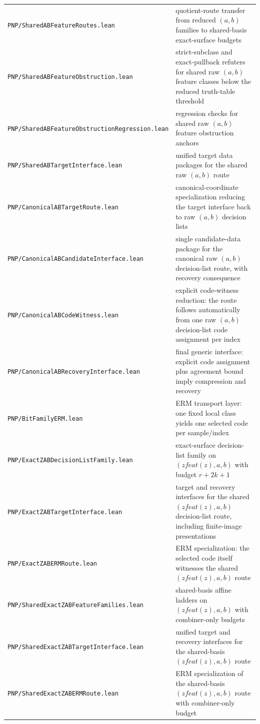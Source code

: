 \documentclass[11pt]{article}
\theoremstyle{remark}
\begin{document}
\begin{center}
\begin{tabular}{ll}
\texttt{PNP/SharedABFeatureRoutes.lean} & quotient-route transfer from reduced $(a,b)$ families to shared-basis exact-surface budgets \\
\texttt{PNP/SharedABFeatureObstruction.lean} & strict-subclass and exact-pullback refuters for shared raw $(a,b)$ feature classes below the reduced truth-table threshold \\
\texttt{PNP/SharedABFeatureObstructionRegression.lean} & regression checks for shared raw $(a,b)$ feature obstruction anchors \\
\texttt{PNP/SharedABTargetInterface.lean} & unified target data packages for the shared raw $(a,b)$ route \\
\texttt{PNP/CanonicalABTargetRoute.lean} & canonical-coordinate specialization reducing the target interface back to raw $(a,b)$ decision lists \\
\texttt{PNP/CanonicalABCandidateInterface.lean} & single candidate-data package for the canonical raw $(a,b)$ decision-list route, with recovery consequence \\
\texttt{PNP/CanonicalABCodeWitness.lean} & explicit code-witness reduction: the route follows automatically from one raw $(a,b)$ decision-list code assignment per index \\
\texttt{PNP/CanonicalABRecoveryInterface.lean} & final generic interface: explicit code assignment plus agreement bound imply compression and recovery \\
\texttt{PNP/BitFamilyERM.lean} & ERM transport layer: one fixed local class yields one selected code per sample/index \\
\texttt{PNP/ExactZABDecisionListFamily.lean} & exact-surface decision-list family on $(zfeat(z),a,b)$ with budget $r+2k+1$ \\
\texttt{PNP/ExactZABTargetInterface.lean} & target and recovery interfaces for the shared $(zfeat(z),a,b)$ decision-list route, including finite-image presentations \\
\texttt{PNP/ExactZABERMRoute.lean} & ERM specialization: the selected code itself witnesses the shared $(zfeat(z),a,b)$ route \\
\texttt{PNP/SharedExactZABFeatureFamilies.lean} & shared-basis affine ladders on $(zfeat(z),a,b)$ with combiner-only budgets \\
\texttt{PNP/SharedExactZABTargetInterface.lean} & unified target and recovery interfaces for the shared-basis $(zfeat(z),a,b)$ route \\
\texttt{PNP/SharedExactZABERMRoute.lean} & ERM specialization of the shared-basis $(zfeat(z),a,b)$ route with combiner-only budget \\

\end{tabular}
\end{center}
\end{document}
